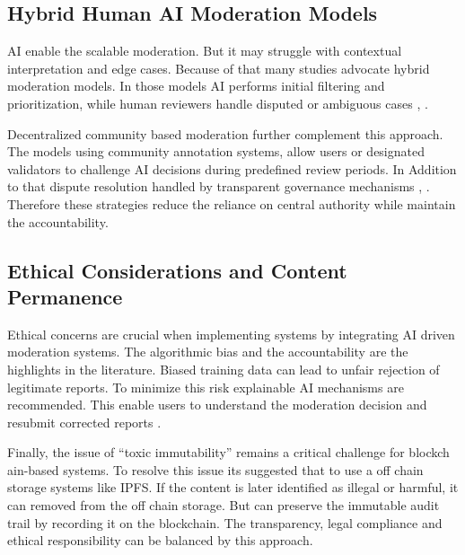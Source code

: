 \subsection{Hybrid Human AI Moderation Models}

AI enable the scalable moderation. But it may struggle with contextual interpretation and edge cases. Because of that many studies advocate hybrid moderation models. In those models AI performs initial filtering and prioritization, while human reviewers handle disputed or ambiguous cases \cite{mohammadi2025ai}, \cite{kumar2025hybrid}. 

Decentralized community based moderation further complement this approach. The models using community annotation systems, allow users or designated validators to challenge AI decisions during predefined review periods. In Addition to that dispute resolution handled by transparent governance mechanisms \cite{dzone2026blockchainai}, \cite{kae2025research}. Therefore these strategies reduce the reliance on central authority while maintain the accountability.

\subsection{Ethical Considerations and Content Permanence}

Ethical concerns are crucial when implementing systems by integrating AI driven moderation systems. The algorithmic bias and the accountability are the highlights in the literature. Biased training data can lead to unfair rejection of legitimate reports\cite{chase2024ai}. To minimize this risk explainable AI mechanisms are recommended. This enable users to understand the moderation decision and resubmit corrected reports \cite{mounika2024integrated}. 

Finally, the issue of “toxic immutability” remains a critical challenge for blockch\\ain-based systems. To resolve this issue its suggested that to use a off chain storage systems like IPFS. If the content is later identified as illegal or harmful, it can removed from the off chain storage. But can preserve the immutable audit trail by recording it on the blockchain\cite{prasad2024blockchain}. The transparency, legal compliance and ethical responsibility can be balanced by this approach.

